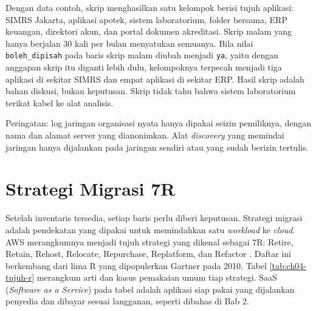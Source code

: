 \begin{pendalaman}[title={Pendalaman Teknis (opsional): Kelompok Pindah dari Log Jaringan}]
  Dengan data contoh, skrip menghasilkan satu kelompok berisi tujuh aplikasi: SIMRS
  Jakarta, aplikasi apotek, sistem laboratorium, folder bersama, ERP keuangan, direktori
  akun, dan portal dokumen akreditasi. Skrip malam yang hanya berjalan 30 kali per bulan
  menyatukan semuanya. Bila nilai \texttt{boleh\_dipisah} pada baris skrip malam diubah
  menjadi \texttt{ya}, yaitu dengan anggapan skrip itu diganti lebih dulu, kelompoknya
  terpecah menjadi tiga aplikasi di sekitar SIMRS dan empat aplikasi di sekitar ERP.
  Hasil skrip adalah bahan diskusi, bukan keputusan. Skrip tidak tahu bahwa sistem
  laboratorium terikat kabel ke alat analisis.

  Peringatan: log jaringan organisasi nyata hanya dipakai seizin pemiliknya, dengan nama
  dan alamat server yang dianonimkan. Alat \textit{discovery} yang memindai jaringan hanya
  dijalankan pada jaringan sendiri atau yang sudah berizin tertulis.
\end{pendalaman}

\section{Strategi Migrasi 7R}
\label{sec:ch04-7r}

Setelah inventaris tersedia, setiap baris perlu diberi keputusan. Strategi migrasi adalah
pendekatan yang dipakai untuk memindahkan satu \textit{workload} ke \textit{cloud}. AWS
merangkumnya menjadi tujuh strategi yang dikenal sebagai 7R: Retire, Retain, Rehost,
Relocate, Repurchase, Replatform, dan Refactor \cite{aws7r}. Daftar ini berkembang dari
lima R yang dipopulerkan Gartner pada 2010. Tabel \ref{tab:ch04-tujuh-r} merangkum arti
dan kasus pemakaian umum tiap strategi. SaaS (\textit{Software as a Service}) pada tabel
adalah aplikasi siap pakai yang dijalankan penyedia dan dibayar sesuai langganan, seperti
dibahas di Bab 2.

